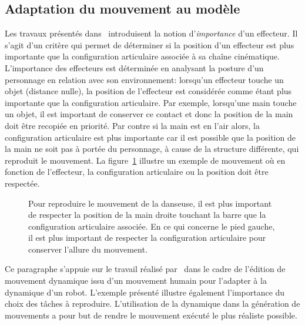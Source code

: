\subsection{Adaptation du mouvement au modèle}
Les travaux présentés dans~\cite{shin01} introduisent la notion
d'\emph{importance} d'un effecteur. Il s'agit d'un critère qui permet de
déterminer si la position d'un effecteur est plus importante que la configuration articulaire associée
à sa chaîne cinématique.
L'importance des effecteurs est déterminée en analysant la posture d'un personnage
en relation avec son environnement: lorsqu'un effecteur touche
un objet (distance nulle), la position de l'effecteur est considérée comme étant plus importante
que la configuration articulaire. Par exemple, lorsqu'une main touche un objet,
il est important de conserver ce contact et donc la position de la main doit
être recopiée en priorité. Par contre si la main est en l'air alors,
la configuration articulaire est plus importante car il est possible que la position
de la main ne soit pas à portée du personnage, à cause de la structure différente,
qui reproduit le mouvement. La figure~\ref{fig:ballet} illustre un exemple
de mouvement où en fonction de l'effecteur, la configuration articulaire
ou la position doit être respectée.
\begin{figure}[p]
  \begin{center}
    \resizebox{0.4\textwidth}{!}{
    
    }
  \end{center}
  \caption[Que faut-il reproduire?]{Pour reproduire le mouvement de la danseuse, il est plus important
  de respecter la position de la main droite touchant la barre que la configuration articulaire associée.
  En ce qui concerne le pied gauche, il est plus important de respecter la configuration articulaire pour
  conserver l'allure du mouvement.}
  \label{fig:ballet}
\end{figure}

Ce paragraphe s'appuie sur le travail réalisé par~\cite{ramos11} dans le 
cadre de l'édition de mouvement dynamique issu d'un mouvement humain pour l'adapter
à la dynamique d'un robot. L'exemple présenté illustre également l'importance
du choix des t\^aches à reproduire. L'utilisation de la dynamique dans la génération de 
mouvements a pour but de rendre le mouvement exécuté le plus réaliste possible. 

